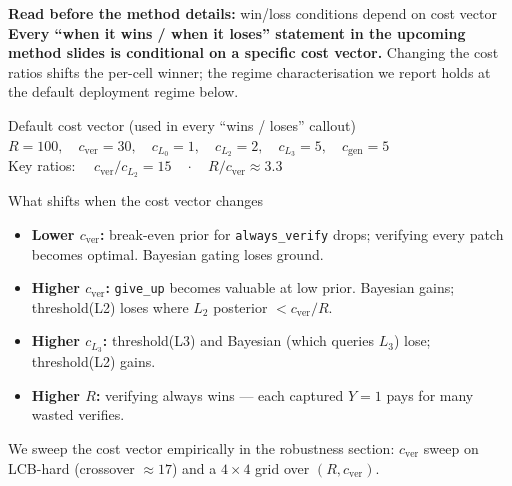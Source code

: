 \documentclass[10pt]{beamer}
\newcommand{\warn}[1]{\textcolor{accentOrange}{\textbf{#1}}}
\newcommand{\info}[1]{\textcolor{primaryBlue}{\textbf{#1}}}
\begin{document}
\begin{frame}{\warn{Read before the method details:} win/loss conditions depend on cost vector}
\info{Every ``when it wins / when it loses'' statement in the upcoming
method slides is conditional on a specific cost vector.} Changing the cost
ratios shifts the per-cell winner; the regime characterisation we report
holds at the default deployment regime below.

\begin{block}{Default cost vector (used in every ``wins / loses'' callout)}
\centering
$R = 100,\quad c_\text{ver} = 30,\quad c_{L_0} = 1,\quad c_{L_2} = 2,\quad c_{L_3} = 5,\quad c_\text{gen} = 5$\\[3pt]
Key ratios: $\quad c_\text{ver}/c_{L_2} = 15 \quad \cdot \quad R/c_\text{ver} \approx 3.3$
\end{block}

\begin{exampleblock}{What shifts when the cost vector changes}
\footnotesize
\begin{itemize}\setlength\itemsep{0pt}
\item \warn{Lower $c_\text{ver}$:} break-even prior for \texttt{always\_verify}
drops; verifying every patch becomes optimal. Bayesian gating loses ground.
\item \warn{Higher $c_\text{ver}$:} \texttt{give\_up} becomes valuable at low
prior. Bayesian gains; threshold(L2) loses where $L_2$ posterior $< c_\text{ver}/R$.
\item \warn{Higher $c_{L_3}$:} threshold(L3) and Bayesian (which queries $L_3$) lose; threshold(L2) gains.
\item \warn{Higher $R$:} verifying always wins --- each captured $Y{=}1$ pays for many wasted verifies.
\end{itemize}
\end{exampleblock}

\textcolor{softGrey}{\tiny We sweep the cost vector empirically in the
robustness section: $c_\text{ver}$ sweep on LCB-hard (crossover $\approx 17$)
and a $4{\times}4$ grid over $(R, c_\text{ver})$.}
\end{frame}
\end{document}
